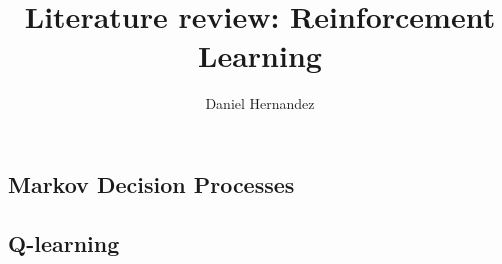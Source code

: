 \documentclass{article}
\title{\textbf{Literature review: Reinforcement Learning}}
\author{Daniel Hernandez}
\date{ }
\begin{document}
\maketitle


% 
% 
%
%
    \subsection{Markov Decision Processes}
    
    
    \subsection{Q-learning}
    
 
% 
%
% 
% 
% 

%





\end{document}

